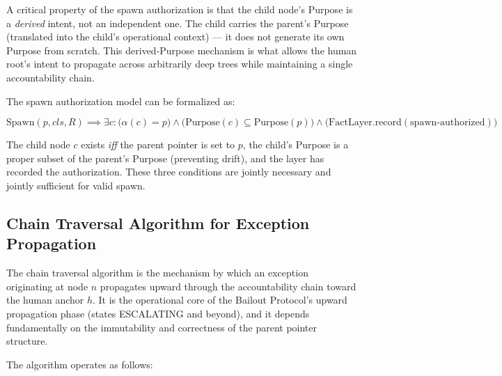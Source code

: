 A critical property of the spawn authorization is that the child node's Purpose is a \emph{derived} intent, not an independent one. The child carries the parent's Purpose (translated into the child's operational context) — it does not generate its own Purpose from scratch. This derived-Purpose mechanism is what allows the human root's intent to propagate across arbitrarily deep trees while maintaining a single accountability chain.

The spawn authorization model can be formalized as:

\begin{equation}
\text{Spawn}(p, cls, R) \implies \exists c: \bigl(\alpha(c) = p\bigr) \land \bigl(\text{Purpose}(c) \subseteq \text{Purpose}(p)\bigr) \land \bigl(\text{FactLayer.record}(\text{spawn-authorized})\bigr)
\tag{SP-1}
\end{equation}

The child node $c$ exists \emph{iff} the parent pointer is set to $p$, the child's Purpose is a proper subset of the parent's Purpose (preventing drift), and the \fact{} layer has recorded the authorization. These three conditions are jointly necessary and jointly sufficient for valid spawn.

\subsection{Chain Traversal Algorithm for Exception Propagation}

The chain traversal algorithm is the mechanism by which an exception originating at node $n$ propagates upward through the accountability chain toward the human anchor $h$. It is the operational core of the Bailout Protocol's upward propagation phase (states ESCALATING and beyond), and it depends fundamentally on the immutability and correctness of the parent pointer structure.

The algorithm operates as follows:

